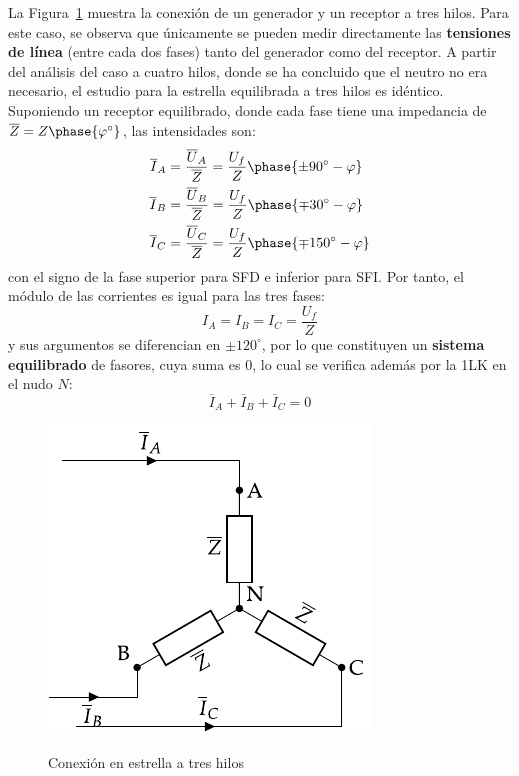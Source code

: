 	
	
	La Figura~\ref{fig:conexion_estrella_3} muestra la conexión de un generador y un receptor a tres hilos. Para este caso, se observa que únicamente se pueden medir directamente las \textbf{tensiones de línea} (entre cada dos fases) tanto del generador como del receptor. A partir del análisis del caso a cuatro hilos, donde se ha concluido que el neutro no era necesario, el estudio para la estrella equilibrada a tres hilos es idéntico. Suponiendo un receptor equilibrado, donde cada fase tiene una impedancia de $\overline{Z}=Z\phase{\varphi^\circ}$, las intensidades son:
	\begin{align*}
      \overline{I}_A &= \frac{\overline{U}_A}{\overline{Z}} = \frac{U_f}{Z}\phase{{\pm 90^\circ} - \varphi} \\
      \overline{I}_B &= \frac{\overline{U}_B}{\overline{Z}} = \frac{U_f}{Z}\phase{{\mp 30^\circ} - \varphi}\\
      \overline{I}_C &= \frac{\overline{U}_C}{\overline{Z}} = \frac{U_f}{Z}\phase{{\mp 150^\circ} - \varphi}
    \end{align*}
    con el signo de la fase superior para SFD e inferior para SFI. Por tanto, el módulo de las corrientes es igual para las tres fases: 
    \begin{equation}
        \boxed{I_A = I_B = I_C = \dfrac{U_f}{Z}}
    \end{equation}
    y sus argumentos se diferencian en $\pm120^\circ$, por lo que constituyen un \textbf{sistema equilibrado} de fasores, cuya suma es 0, lo cual se verifica además por la 1LK en el nudo $N$: 
    \begin{equation*}
        \overline{I}_A  + \overline{I}_B + \overline{I}_C = 0
    \end{equation*}
	\begin{figure}[H]
		\centering
		{\includegraphics{../figs/EstrellaEquilibrado_Receptor_SN.pdf}}
		\caption{Conexión en estrella a tres hilos}
		\label{fig:conexion_estrella_3}
	\end{figure}

